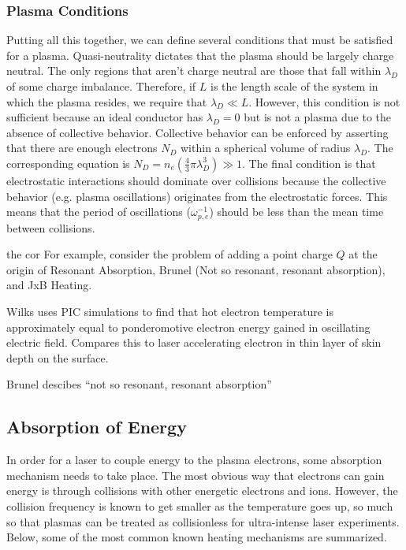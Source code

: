 \subsubsection{Plasma Conditions}
Putting all this together, we can define several conditions that must be satisfied for a plasma\cite{Chen_2015_Plasma}. Quasi-neutrality dictates that the plasma should be largely charge neutral. The only regions that aren't charge neutral are those that fall within $\lambda_D$ of some charge imbalance. Therefore, if $L$ is the length scale of the system in which the plasma resides, we require that $\lambda_D \ll L$. However, this condition is not sufficient because an ideal conductor has $\lambda_D = 0$ but is not a plasma due to the absence of collective behavior. Collective behavior can be enforced by asserting that there are enough electrons $N_D$ within a spherical volume of radius $\lambda_D$. The corresponding equation is $N_D = n_e (\frac{4}{3} \pi \lambda_D^3) \gg 1$. The final condition is that electrostatic interactions should dominate over collisions because the collective behavior (e.g. plasma oscillations) originates from the electrostatic forces. This means that the period of oscillations ($\omega_{p,e}^{-1}$) should be less than the mean time between collisions. 


the cor For example, consider the problem of adding a point charge $Q$ at the origin of 
Resonant Absorption, Brunel (Not so resonant, resonant absorption), and JxB Heating.

Wilks \cite{Wilks_1992_PRL} uses PIC simulations to find that hot electron temperature is approximately equal to ponderomotive electron energy gained in oscillating electric field. Compares this to laser accelerating electron in thin layer of skin depth on the surface.

Brunel \cite{Brunel_1987_PRL} descibes ``not so resonant, resonant absorption''

\subsection{Absorption of Energy} \label{sec:absorption}

In order for a laser to couple energy to the plasma electrons, some absorption mechanism needs to take place. The most obvious way that electrons can gain energy is through collisions with other energetic electrons and ions. However, the collision frequency is known to get smaller as the temperature goes up\cite{Gibbon_2005_Plasma}, so much so that plasmas can be treated as collisionless for ultra-intense laser experiments. Below, some of the most common known heating mechanisms are summarized.

